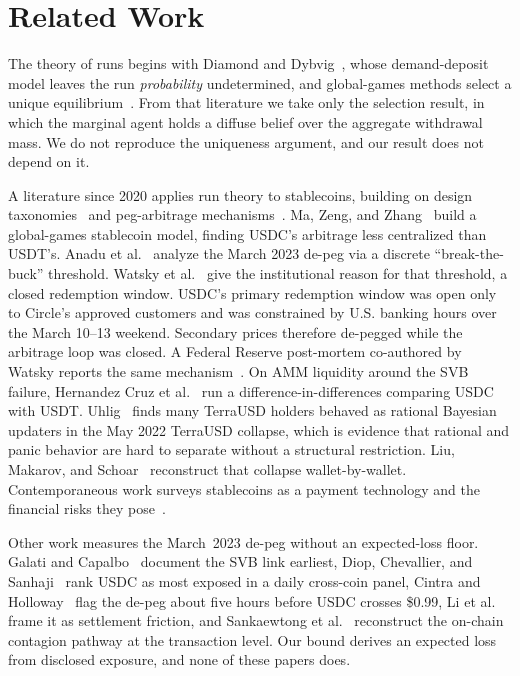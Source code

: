 \section{Related Work}
\label{sec:lit}

The theory of runs begins with Diamond and Dybvig~\cite{diamonddybvig1983}, whose
demand-deposit model leaves the run \emph{probability} undetermined, and global-games
methods select a unique equilibrium~\cite{carlssonvandamme1993,morrisshin1998,goldsteinpauzner2005}.
From that literature we take only the selection result, in which the marginal agent holds a
diffuse belief over the aggregate withdrawal mass. We do not reproduce the uniqueness
argument, and our result does not depend on it.

A literature since 2020 applies run theory to stablecoins, building on design
taxonomies~\cite{Moin_2020,Klages_Mundt_2020} and peg-arbitrage
mechanisms~\cite{Lyons_2023}. Ma, Zeng, and Zhang~\cite{mzz2025} build a global-games
stablecoin model, finding USDC's arbitrage less centralized than USDT's. Anadu et
al.~\cite{anadu2024} analyze the March 2023 de-peg via a discrete ``break-the-buck'' threshold.
Watsky et al.~\cite{watsky2024} give the institutional reason for that threshold, a closed
redemption window. USDC's primary redemption window
was open only to Circle's approved customers and was constrained by U.S. banking hours over
the March 10--13 weekend. Secondary prices therefore de-pegged while the arbitrage loop
was closed. A Federal Reserve post-mortem co-authored by Watsky reports the same
mechanism~\cite{fedshadow2025}. On AMM liquidity around the SVB
failure, Hernandez Cruz et al.~\cite{hernandezcruz2024} run a difference-in-differences
comparing USDC with USDT. Uhlig~\cite{uhlig2022} finds many TerraUSD holders behaved as
rational Bayesian updaters in the May 2022 TerraUSD collapse, which is evidence that
rational and panic behavior are hard to separate without a structural restriction. Liu,
Makarov, and Schoar~\cite{liumakarovschoar2023} reconstruct that collapse wallet-by-wallet.
Contemporaneous work surveys stablecoins as a payment technology and the financial risks
they pose~\cite{ahmed2025stablecoins}.

Other work measures the March~2023 de-peg without an expected-loss floor. Galati and
Capalbo~\cite{galaticapalbo2023} document the SVB link earliest, Diop, Chevallier, and
Sanhaji~\cite{diop2024fintech} rank USDC as most exposed in a daily cross-coin panel,
Cintra and Holloway~\cite{cintraholloway2023depegs} flag the de-peg about five hours before USDC crosses
\$0.99, Li et al.~\cite{li2026settlementfriction} frame it as settlement friction, and
Sankaewtong et al.~\cite{sankaewtong2026contagion} reconstruct the on-chain contagion
pathway at the transaction level. Our bound derives an expected loss from disclosed
exposure, and none of these papers does.

